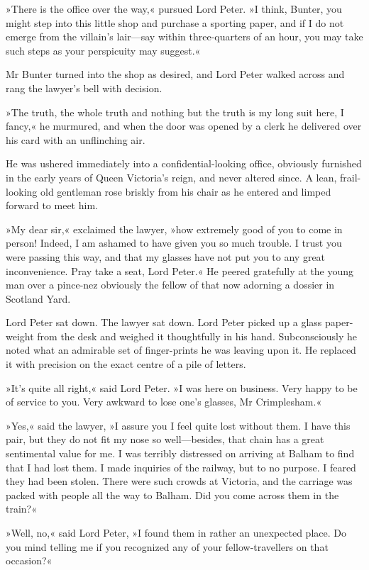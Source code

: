 »There is the office over the way,« pursued Lord Peter. »I think, Bunter, you might step into this little shop and purchase a sporting paper, and if I do not emerge from the villain's lair\allowbreak---\allowbreak say within three-quarters of an hour, you may take such steps as your perspicuity may suggest.«

Mr Bunter turned into the shop as desired, and Lord Peter walked across and rang the lawyer's bell with decision.

»The truth, the whole truth and nothing but the truth is my long suit here, I fancy,« he murmured, and when the door was opened by a clerk he delivered over his card with an unflinching air.

He was ushered immediately into a confidential-looking office, obviously furnished in the early years of Queen Victoria's reign, and never altered since. A lean, frail-looking old gentleman rose briskly from his chair as he entered and limped forward to meet him.

»My dear sir,« exclaimed the lawyer, »how extremely good of you to come in person! Indeed, I am ashamed to have given you so much trouble. I trust you were passing this way, and that my glasses have not put you to any great inconvenience. Pray take a seat, Lord Peter.« He peered gratefully at the young man over a pince-nez obviously the fellow of that now adorning a dossier in Scotland Yard.

Lord Peter sat down. The lawyer sat down. Lord Peter picked up a glass paper-weight from the desk and weighed it thoughtfully in his hand. Subconsciously he noted what an admirable set of finger-prints he was leaving upon it. He replaced it with precision on the exact centre of a pile of letters.

»It's quite all right,« said Lord Peter. »I was here on business. Very happy to be of service to you. Very awkward to lose one's glasses, Mr Crimplesham.«

»Yes,« said the lawyer, »I assure you I feel quite lost without them. I have this pair, but they do not fit my nose so well\allowbreak---\allowbreak besides, that chain has a great sentimental value for me. I was terribly distressed on arriving at Balham to find that I had lost them. I made inquiries of the railway, but to no purpose. I feared they had been stolen. There were such crowds at Victoria, and the carriage was packed with people all the way to Balham. Did you come across them in the train?«

»Well, no,« said Lord Peter, »I found them in rather an unexpected place. Do you mind telling me if you recognized any of your fellow-travellers on that occasion?«

